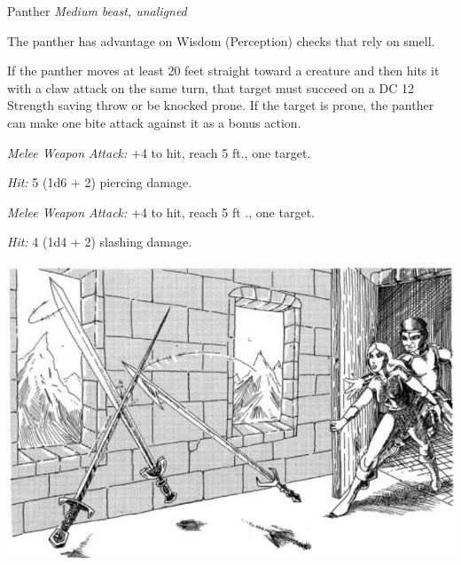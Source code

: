 \documentclass[palace_of_the_silver_princess]{subfiles}
\begin{document}
\begin{monsterbox}{Panther}
	\textit{Medium beast, unaligned}\\
	\hline
	\basics[
		armorclass = {12},
		hitpoints = {13 (3d8)},
		speed = {50~ft., climb 40~ft.}]
	\hline
	\stats[
		STR = \stat{14},
		DEX = \stat{15},
		CON = \stat{10},
		INT = \stat{3},
		WIS = \stat{14},
		CHA = \stat{7}]
	\hline
	\details[
        skills = {Perception +3, Stealth +6},
		senses = {passive Perception 14},
		languages = {---},
		challenge = {1/4 (50 XP)}]
	\hline
	\begin{monsteraction}
        The panther has advantage on Wisdom (Perception) checks that rely on
        smell.
	\end{monsteraction}

    \begin{monsteraction}[Pounce]
        If the panther moves at least 20 feet straight toward a creature
        and then hits it with a claw attack on the same turn, that
        target must succeed on a DC 12 Strength saving throw or be
        knocked prone. If the target is prone, the panther can make one
        bite attack against it as a bonus action.
	\end{monsteraction}
    \begin{monsteraction}[Bite]
		\textit{Melee Weapon Attack:} +4 to hit, reach 5 ft., one
        target.

        \textit{Hit:} 5 (1d6 + 2) piercing damage.
	\end{monsteraction}

    \begin{monsteraction}[Claw]
		\textit{Melee Weapon Attack:} +4 to hit, reach 5 ft ., one
        target.

        \textit{Hit:} 4 (1d4 + 2) slashing damage.
	\end{monsteraction}
\end{monsterbox}

\includegraphics[width=\columnwidth]{img/trick_fight.png}
\end{document}
